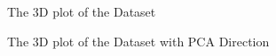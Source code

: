 \documentclass[paper=a4, fontsize=11pt]{scrartcl}
\numberwithin{equation}{section}		%
\numberwithin{figure}{section}			%
\numberwithin{table}{section}				%
\begin{document}
\graphicspath{ {../EE15B025_PA2/Code/q1/} }
\begin{figure}[H]
  \centering
  \hfill
  \caption*{The 3D plot of the Dataset}
\end{figure}

\begin{figure}[H]
  \centering
  \hfill
  \caption*{The 3D plot of the Dataset with PCA Direction}
\end{figure}
\end{document}
